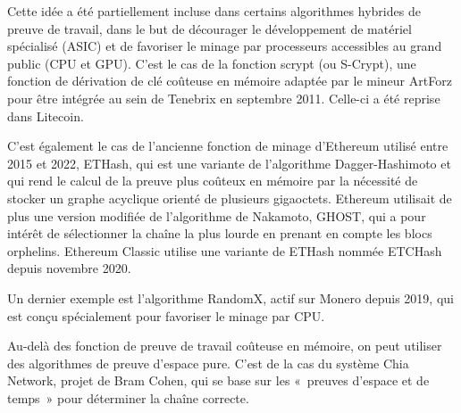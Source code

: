 Cette idée a été partiellement incluse dans certains algorithmes hybrides de preuve de travail, dans le but de décourager le développement de matériel spécialisé (ASIC) et de favoriser le minage par processeurs accessibles au grand public (CPU et GPU). C'est le cas de la fonction scrypt (ou S-Crypt), une fonction de dérivation de clé coûteuse en mémoire adaptée par le mineur ArtForz pour être intégrée au sein de Tenebrix en septembre 2011. Celle-ci a été reprise dans Litecoin.

C'est également le cas de l'ancienne fonction de minage d'Ethereum utilisé entre 2015 et 2022, ETHash, qui est une variante de l'algorithme Dagger-Hashimoto et qui rend le calcul de la preuve plus coûteux en mémoire par la nécessité de stocker un graphe acyclique orienté de plusieurs gigaoctets. Ethereum utilisait de plus une version modifiée de l'algorithme de Nakamoto, GHOST, qui a pour intérêt de sélectionner la chaîne la plus lourde en prenant en compte les blocs orphelins. Ethereum Classic utilise une variante de ETHash nommée ETCHash depuis novembre 2020.

Un dernier exemple est l'algorithme RandomX, actif sur Monero depuis 2019, qui est conçu spécialement pour favoriser le minage par CPU.

Au-delà des fonction de preuve de travail coûteuse en mémoire, on peut utiliser des algorithmes de preuve d'espace pure. C'est de la cas du système Chia Network, projet de Bram Cohen, qui se base sur les «~preuves d'espace et de temps~» pour déterminer la chaîne correcte.

